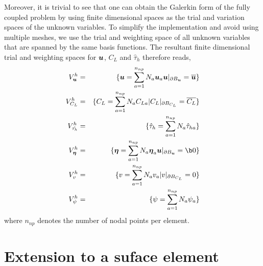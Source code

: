 \documentclass[10pt]{elsarticle}
\newcommand{\mbs}[1]{\boldsymbol{#1}}
\def\beeta{{\mbs{\eta}}}
\begin{document}
Moreover, it is trivial to see that one can obtain the Galerkin form of the fully coupled problem by
 using finite dimensional spaces as the trial and variation spaces of the unknown variables.
To simplify the implementation and avoid using multiple meshes, 
we use the trial and  weighting space of all unknown variables that are spanned by the same basis functions. 
The resultant finite dimensional trial and weighting spaces for $\bu$, $C_{L}$ and $\hat{\tau}_{h}$  therefore reads, 
\begin{eqnarray}
    \label{eq.DisTrialSpaceAndVariation}
      V_{\bu}^{h} &=& \{ \bu = \sum_{a=1}^{n_{np}} N_{a} \bu_{a}  \bu|_{\partial B_{\bu}} = \overline{\bu} \} \nonumber \\
       V_{C_{L}}^{h} &=& \{ C_{L} = \sum_{a=1}^{n_{np}} N_{a} C_{La} |  C_{L}|_{\partial B_{C_{L}}} = \overline{C_{L}} \} \\
      V_{\hat{\tau_{h}}}^{h} &=& \{ \hat{\tau}_{h} =  \sum_{a=1}^{n_{np}} N_{a}  \hat{\tau}_{ha} \} \nonumber \\
    \label{eq.DisVariation}
      V_{\beeta}^{h} &=& \{ \beeta = \sum_{a=1}^{n_{np}} N_{a} \beeta_{a}  \bu|_{\partial B_{\bu}} = \b0 \} \nonumber \\
      V_{v}^{h} &=& \{ v = \sum_{a=1}^{n_{np}} N_{a} v_{a} |  v|_{\partial B_{C_{L}}} = 0 \} \\
      V_{\psi}^{h} &=& \{ \psi =  \sum_{a=1}^{n_{np}} N_{a}  \psi_{a} \} \nonumber 
      \nonumber 
      \label{eq:varp}
    \end{eqnarray}
where $n_{np}$ denotes the number of nodal points per element.     

\section{Extension to a suface element}
\label{section.extension}
\end{document}
